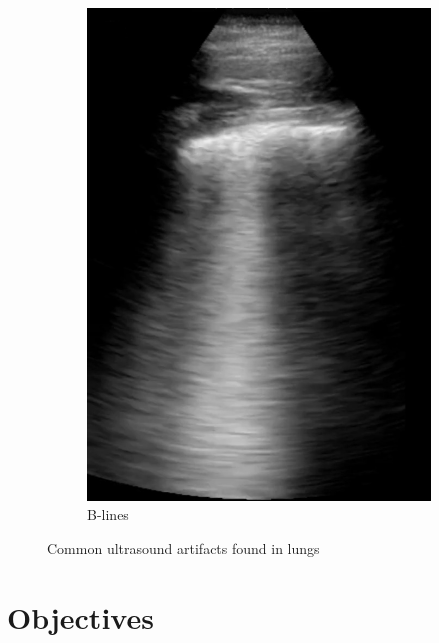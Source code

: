 \documentclass[12pt]{article} %
\begin{document}
\begin{figure}
\begin{subfigure}{0.3\textwidth}
		\includegraphics[width=\textwidth]{figuras/blines.jpg}
		\caption{B-lines}
		\end{subfigure}	
	\caption{Common ultrasound artifacts found in lungs}	
	\end{figure}
	
	
	
\section{Objectives}	
	
\end{document}

